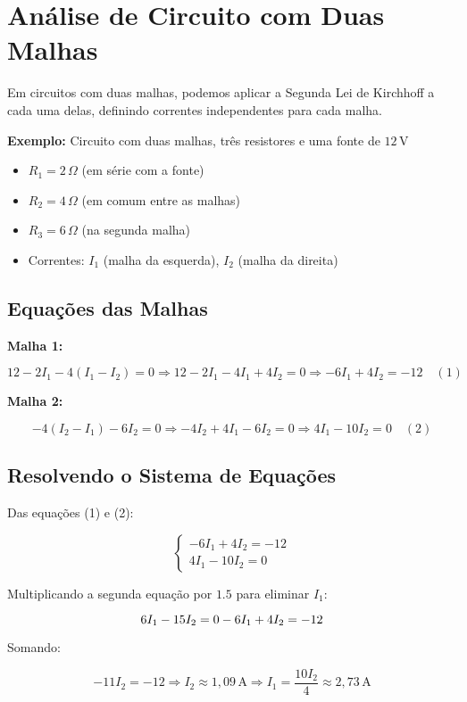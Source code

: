 \section{Análise de Circuito com Duas Malhas}
Em circuitos com duas malhas, podemos aplicar a Segunda Lei de Kirchhoff a cada uma delas, definindo correntes independentes para cada malha.

\textbf{Exemplo:} Circuito com duas malhas, três resistores e uma fonte de $12\,\text{V}$

\begin{itemize}
    \item $R_1 = 2\,\Omega$ (em série com a fonte)
    \item $R_2 = 4\,\Omega$ (em comum entre as malhas)
    \item $R_3 = 6\,\Omega$ (na segunda malha)
    \item Correntes: $I_1$ (malha da esquerda), $I_2$ (malha da direita)
\end{itemize}

\subsection{Equações das Malhas}

\textbf{Malha 1:}

\[
12 - 2I_1 - 4(I_1 - I_2) = 0
\Rightarrow 12 - 2I_1 - 4I_1 + 4I_2 = 0
\Rightarrow -6I_1 + 4I_2 = -12 \quad (1)
\]

\textbf{Malha 2:}

\[
-4(I_2 - I_1) - 6I_2 = 0
\Rightarrow -4I_2 + 4I_1 - 6I_2 = 0
\Rightarrow 4I_1 - 10I_2 = 0 \quad (2)
\]

\subsection{Resolvendo o Sistema de Equações}
Das equações (1) e (2):

\[
\begin{cases}
-6I_1 + 4I_2 = -12 \\
4I_1 - 10I_2 = 0
\end{cases}
\]

Multiplicando a segunda equação por $1.5$ para eliminar $I_1$:

\[
6I_1 - 15I_2 = 0 \\
-6I_1 + 4I_2 = -12
\]

Somando:

\[
-11I_2 = -12 \Rightarrow I_2 \approx 1{,}09\,\text{A}
\Rightarrow I_1 = \frac{10I_2}{4} \approx 2{,}73\,\text{A}
\]

